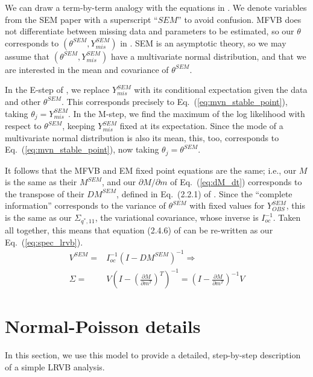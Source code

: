\documentclass{article}\usepackage[]{graphicx}\usepackage[]{color}
\newcommand{\eq}[1]{Eq.~(\ref{eq:#1})}
\newcommand{\eqw}[1]{Eq.~(#1)}
\newcommand{\vbcov}{V} %
\begin{document}
We can draw a term-by-term analogy with
the equations in \citep{meng:1991:using}. We denote variables
from the SEM paper with a superscript ``$SEM$'' to avoid confusion.
MFVB does not differentiate between missing
data and parameters to be estimated, so our $\theta$ corresponds to
$(\theta^{SEM}, Y_{mis}^{SEM})$ in \citep{meng:1991:using}.
SEM is an asymptotic
theory, so we may assume that $(\theta^{SEM}, Y_{mis}^{SEM})$ have a
multivariate normal
distribution, and that we are interested in the mean and covariance of
$\theta^{SEM}$.

In the E-step of \citep{meng:1991:using}, we replace $Y_{mis}^{SEM}$ with
its conditional expectation given the data and other $\theta^{SEM}$.
This corresponds precisely to \eq{mvn_stable_point}, taking
$\theta_j = Y_{mis}^{SEM}$.  In the M-step, we find the maximum
of the log likelihood with respect to $\theta^{SEM}$, keeping
$Y_{mis}^{SEM}$ fixed at its expectation.  Since the mode
of a multivariate normal distribution is also its mean,
this, too, corresponds to \eq{mvn_stable_point}, now taking
$\theta_j = \theta^{SEM}$.

It follows that the MFVB and EM fixed point equations are the same;
i.e., our $M$ is the same as their $M^{SEM}$, and
our $\partial M / \partial m$ of \eq{dM_dt} corresponds
to the transpose of their $DM^{SEM}$, defined in \eqw{2.2.1}
of \citep{meng:1991:using}.  Since the ``complete information'' corresponds to
the variance of $\theta^{SEM}$ with fixed values for $Y_{OBS}^{SEM}$,
this is the same as our $\Sigma_{q^*,11}$, the variational covariance,
whose inverse is $I_{oc}^{-1}$.  Taken all together, this means that
equation (2.4.6) of \citep{meng:1991:using} can be
re-written as our \eq{spec_lrvb}.
%
\begin{align*}
V^{SEM} =& I_{oc}^{-1} \left(I - DM^{SEM}\right)^{-1} \Rightarrow\\
\Sigma =& \vbcov \left(I - \left(\frac{\partial M}{\partial m^T}\right)^T \right)^{-1}
       = \left(I - \frac{\partial M}{\partial m^T} \right)^{-1} \vbcov
\end{align*}

\section{Normal-Poisson details} \label{app:np_details}

In this section, we use this model to provide a detailed, step-by-step description of
a simple LRVB analysis.
\end{document}
